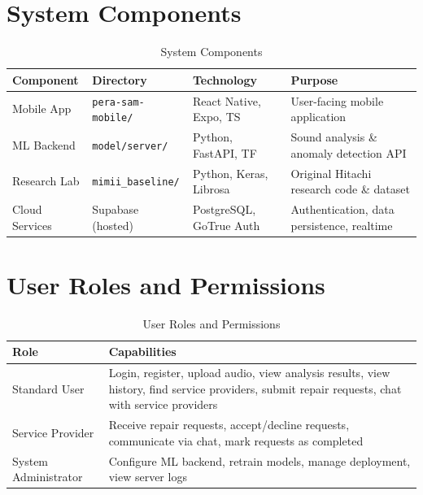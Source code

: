 \documentclass[10pt, a4paper, oneside]{report}
\begin{document}
\section{System Components}
\label{sec:sys-components}

\begin{table}[H]
\centering
\caption{System Components}
\label{tab:components}
\begin{tabularx}{\textwidth}{l l l X}
  \toprule
  \textbf{Component} & \textbf{Directory} & \textbf{Technology} & \textbf{Purpose} \\
  \midrule
  Mobile App     & \texttt{pera-sam-mobile/} & React Native, Expo, TS   & User-facing mobile application \\
  ML Backend     & \texttt{model/server/}    & Python, FastAPI, TF      & Sound analysis \& anomaly detection API \\
  Research Lab   & \texttt{mimii\_baseline/} & Python, Keras, Librosa   & Original Hitachi research code \& dataset \\
  Cloud Services & Supabase (hosted)         & PostgreSQL, GoTrue Auth  & Authentication, data persistence, realtime \\
  \bottomrule
\end{tabularx}
\end{table}

\section{User Roles and Permissions}
\label{sec:roles}

\begin{table}[H]
\centering
\caption{User Roles and Permissions}
\label{tab:roles}
\begin{tabularx}{\textwidth}{l X}
  \toprule
  \textbf{Role} & \textbf{Capabilities} \\
  \midrule
  Standard User       & Login, register, upload audio, view analysis results, view history, find service providers, submit repair requests, chat with service providers \\
  Service Provider     & Receive repair requests, accept/decline requests, communicate via chat, mark requests as completed \\
  System Administrator & Configure ML backend, retrain models, manage deployment, view server logs \\
  \bottomrule
\end{tabularx}
\end{table}
\end{document}
